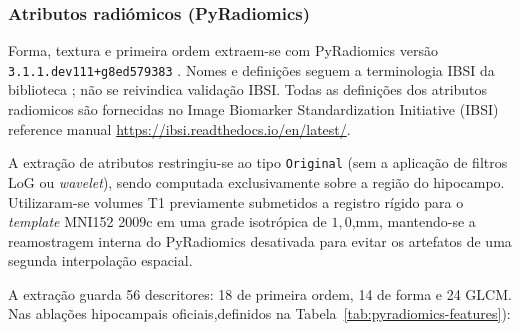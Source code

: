 \documentclass[review]{elsarticle}
\newcommand{\code}[1]{\texttt{#1}}
\begin{document}
\subsubsection{Atributos radiómicos (PyRadiomics)}\label{subsubsec:radiomics}

Forma, textura e primeira ordem extraem-se com PyRadiomics versão \code{3.1.1.dev111+g8ed579383} \cite{griethuysen-2017}.
Nomes e definições seguem a terminologia IBSI da biblioteca \cite{zwanenburg-2020}; não se reivindica validação IBSI. Todas as definições dos atributos radiomicos são fornecidas no Image Biomarker Standardization Initiative (IBSI) reference manual \url{https://ibsi.readthedocs.io/en/latest/}.

A extração de atributos restringiu-se ao tipo \code{Original} (sem a aplicação de filtros LoG ou \emph{wavelet}), sendo computada exclusivamente sobre a região do hipocampo. Utilizaram-se volumes T1 previamente submetidos a registro rígido para o \emph{template} MNI152 2009c em uma grade isotrópica de $1{,}0$,mm, mantendo-se a reamostragem interna do PyRadiomics desativada para evitar os artefatos de uma segunda interpolação espacial.

A extração guarda 56 descritores: 18 de primeira ordem, 14 de forma e 24 GLCM.
Nas ablações hipocampais oficiais,definidos na Tabela~\ref{tab:pyradiomics-features}):
\end{document}
